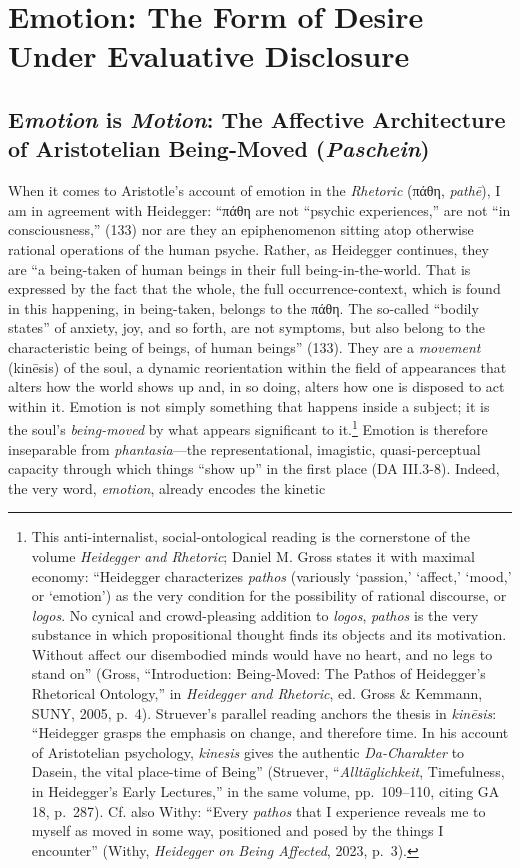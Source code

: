 \documentclass{article}
\newcommand{\gk}[1]{{\greekfont #1}}
\begin{document}
\section{Emotion: The Form of Desire Under Evaluative Disclosure}


\subsection{E\textit{motion} is \textit{Motion}: The Affective Architecture of Aristotelian Being-Moved (\textit{Paschein})}

When it comes to Aristotle’s account of emotion in the \textit{Rhetoric} (\gk{πάθη}, \textit{pathē}), I am in agreement with Heidegger: ``\gk{πάθη} are not ``psychic experiences,'' are not ``in consciousness,'' (133) nor are they an epiphenomenon sitting atop otherwise rational operations of the human psyche. Rather, as Heidegger continues, they are ``a being-taken of human beings in their full being-in-the-world. That is expressed by the fact that the whole, the full occurrence-context, which is found in this happening, in being-taken, belongs to the \gk{πάθη}. The so-called ``bodily states'' of anxiety, joy, and so forth, are not symptoms, but also belong to the characteristic being of beings, of human beings'' (133). They are a \textit{movement} (kinēsis) of the soul, a dynamic reorientation within the field of appearances that alters how the world shows up and, in so doing, alters how one is disposed to act within it. Emotion is not simply something that happens inside a subject; it is the soul’s \textit{being-moved} by what appears significant to it.\footnote{This anti-internalist, social-ontological reading is the cornerstone of the volume \textit{Heidegger and Rhetoric}; Daniel M. Gross states it with maximal economy: ``Heidegger characterizes \textit{pathos} (variously `passion,' `affect,' `mood,' or `emotion') as the very condition for the possibility of rational discourse, or \textit{logos}. No cynical and crowd-pleasing addition to \textit{logos}, \textit{pathos} is the very substance in which propositional thought finds its objects and its motivation. Without affect our disembodied minds would have no heart, and no legs to stand on'' (Gross, ``Introduction: Being-Moved: The Pathos of Heidegger's Rhetorical Ontology,'' in \textit{Heidegger and Rhetoric}, ed. Gross \& Kemmann, SUNY, 2005, p.~4). Struever's parallel reading anchors the thesis in \textit{kinēsis}: ``Heidegger grasps the emphasis on change, and therefore time. In his account of Aristotelian psychology, \textit{kinesis} gives the authentic \textit{Da-Charakter} to Dasein, the vital place-time of Being'' (Struever, ``\textit{Alltäglichkeit}, Timefulness, in Heidegger's Early Lectures,'' in the same volume, pp.~109--110, citing GA 18, p.~287). Cf. also Withy: ``Every \textit{pathos} that I experience reveals me to myself as moved in some way, positioned and posed by the things I encounter'' (Withy, \textit{Heidegger on Being Affected}, 2023, p.~3).} Emotion is therefore inseparable from \textit{phantasia}—the representational, imagistic, quasi-perceptual capacity through which things “show up” in the first place (DA III.3-8). Indeed, the very word, \textit{emotion}, already encodes the kinetic 
\end{document}

